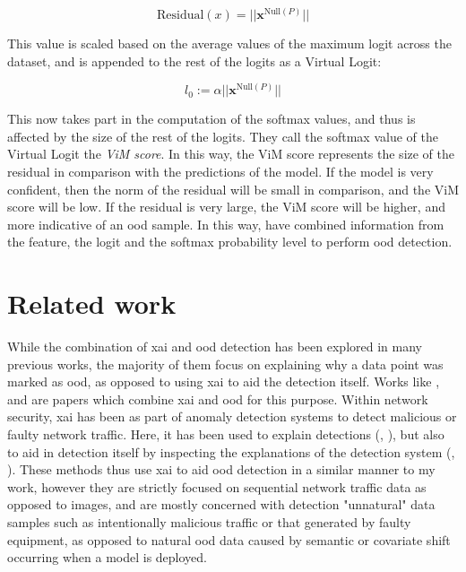 \documentclass[UKenglish]{uiomasterthesis} %
\theoremstyle{definition}
\begin{document}
\begin{equation}
\text{Residual}(x) = || \bm{x}^{\text{Null}(P)}||
\label{virtuallogit}
\end{equation}

This value is scaled based on the average values of the maximum logit across the dataset, and is appended to the rest of the logits as a Virtual Logit:

\begin{equation}
l_0 := \alpha || \bm{x}^{\text{Null}(P)}||
\label{virtuallogit}
\end{equation}

This now takes part in the computation of the softmax values, and thus is affected by the size of the rest of the logits. They call the softmax value of the Virtual Logit the {\it ViM score}. In this way, the ViM score represents the size of the residual in comparison with the predictions of the model. If the model is very confident, then the norm of the residual will be small in comparison, and the ViM score will be low. If the residual is very large, the ViM score will be higher, and more indicative of an \ac{ood} sample. In this way, \cite{vim} have combined information from the feature, the logit and the softmax probability level to perform \ac{ood} detection.

\section{Related work} \label{section:relatedwork}

While the combination of \ac{xai} and \ac{ood} detection has been explored in many previous works, the majority of them focus on explaining why a data point was marked as \ac{ood}, as opposed to using \ac{xai} to aid the detection itself. Works like \cite{uncertainty}, \cite{generalxaiforood} and \cite{tallon2020explainable} are papers which combine \ac{xai} and \ac{ood} for this purpose. Within network security, \ac{xai} has been as part of anomaly detection systems to detect malicious or faulty network traffic. Here, it has been used to explain detections (\cite{idsxai}, \cite{mahbooba}), but also to aid in detection itself by inspecting the explanations of the detection system (\cite{tcydenova2021detection}, \cite{dnsxai}). These methods thus use \ac{xai} to aid \ac{ood} detection in a similar manner to my work, however they are strictly focused on sequential network traffic data as opposed to images, and are mostly concerned with detection "unnatural" data samples such as intentionally malicious traffic or that generated by faulty equipment, as opposed to natural \ac{ood} data caused by semantic or covariate shift occurring when a model is deployed.
\end{document}
